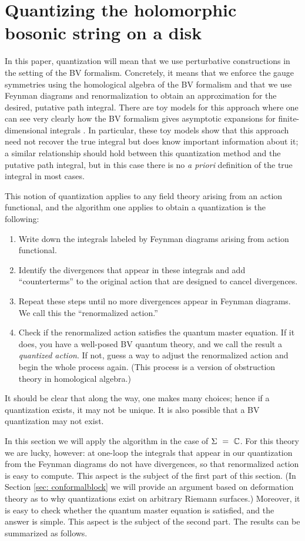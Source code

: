 \section{Quantizing the holomorphic bosonic string on a disk} 
\label{sec: quantization}

In this paper, quantization will mean that we use perturbative constructions in the setting of the BV formalism.
Concretely, it means that we enforce the gauge symmetries using the homological algebra of the BV formalism and that we use Feynman diagrams and renormalization to obtain an approximation for the desired, putative path integral. 
There are toy models for this approach where one can see very clearly how the BV formalism gives asymptotic expansions for finite-dimensional integrals \cite{GJF}.
In particular, these toy models show that this approach need not recover the true integral
but does know important information about it;
a similar relationship should hold between this quantization method and the putative path integral, 
but in this case there is no {\em a priori} definition of the true integral in most cases.

This notion of quantization applies to any field theory arising from an action functional,
and the algorithm one applies to obtain a quantization is the following:
\begin{enumerate}
\item Write down the integrals labeled by Feynman diagrams arising from action functional.
\item Identify the divergences that appear in these integrals and add ``counterterms'' to the original action that are designed to cancel divergences.
\item Repeat these steps until no more divergences appear in Feynman diagrams.
We call this the ``renormalized action.''
\item Check if the renormalized action satisfies the quantum master equation. 
If it does, you have a well-posed BV quantum theory, and we call the result a {\em quantized action}. If not, guess a way to adjust the renormalized action and begin the whole process again.
(This process is a version of obstruction theory in homological algebra.)
\end{enumerate}
It should be clear that along the way, one makes many choices;
hence if a quantization exists, it may not be unique.
It is also possible that a BV quantization may not exist.

In this section we will apply the algorithm in the case of $\Sigma~=~\mathbb C$.
For this theory we are lucky, however:
at one-loop the integrals that appear in our quantization from the Feynman diagrams do not have divergences,
so that renormalized action is easy to compute.
This aspect is the subject of the first part of this section.
(In Section \ref{sec: conformalblock} we will provide an argument based on deformation theory as to why quantizations exist on arbitrary Riemann surfaces.)
Moreover, it is easy to check whether the quantum master equation is satisfied,
and the answer is simple.
This aspect is the subject of the second part.
The results can be summarized as follows.

